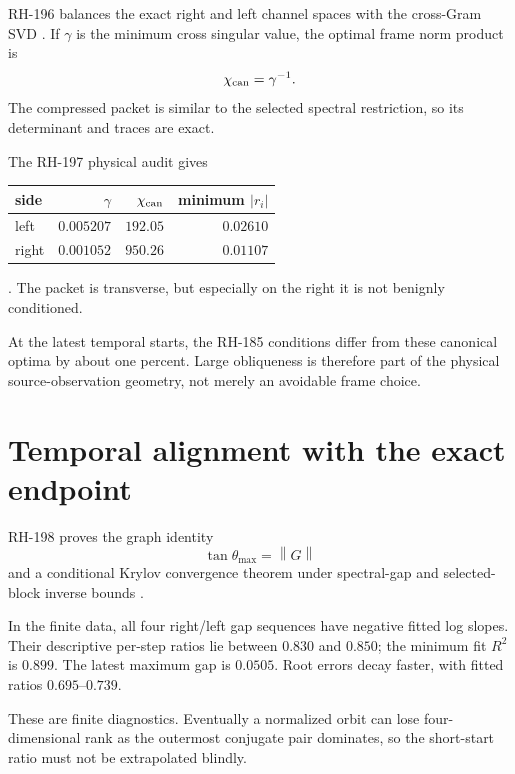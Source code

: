 \documentclass[12pt]{article}
\theoremstyle{remark}
\newcommand{\norm}[1]{\left\lVert#1\right\rVert}
\begin{document}
RH-196 balances the exact right and left channel spaces with the cross-Gram
SVD \citep{WangRH196}.  If $\gamma$ is the minimum cross singular value,
the optimal frame norm product is
\begin{equation}\label{eq:optimal-condition}
 \chi_{\rm can}=\gamma^{-1}.
\end{equation}
The compressed packet is similar to the selected spectral restriction, so
its determinant and traces are exact.

The RH-197 physical audit gives
\begin{center}
\begin{tabular}{lrrr}
\toprule
side & $\gamma$ & $\chi_{\rm can}$ & minimum $|r_i|$\\
\midrule
left & $0.005207$ & $192.05$ & $0.02610$\\
right & $0.001052$ & $950.26$ & $0.01107$\\
\bottomrule
\end{tabular}
\end{center}
\citep{WangRH197}.  The packet is transverse, but especially on the right it
is not benignly conditioned.

At the latest temporal starts, the RH-185 conditions differ from these
canonical optima by about one percent.  Large obliqueness is therefore part
of the physical source-observation geometry, not merely an avoidable frame
choice.

\section{Temporal alignment with the exact endpoint}

RH-198 proves the graph identity
\begin{equation}\label{eq:graph-angle}
 \tan\theta_{\max}=\norm G
\end{equation}
and a conditional Krylov convergence theorem under spectral-gap and
selected-block inverse bounds \citep{WangRH198}.

In the finite data, all four right/left gap sequences have negative fitted
log slopes.  Their descriptive per-step ratios lie between $0.830$ and
$0.850$; the minimum fit $R^2$ is $0.899$.  The latest maximum gap is
$0.0505$.  Root errors decay faster, with fitted ratios $0.695$--$0.739$.

These are finite diagnostics.  Eventually a normalized orbit can lose
four-dimensional rank as the outermost conjugate pair dominates, so the
short-start ratio must not be extrapolated blindly.
\end{document}
